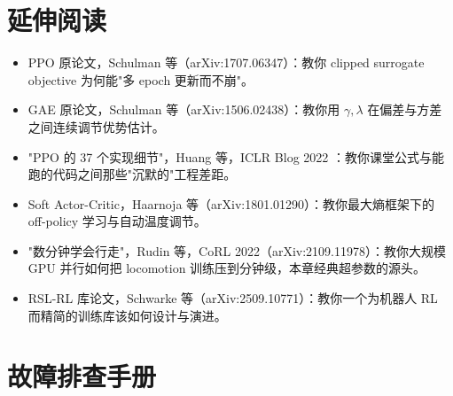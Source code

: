 \section*{延伸阅读}
\label{sec:rlmc-train-further}

\begin{itemize}
  \item PPO 原论文，Schulman 等（arXiv:1707.06347）\cite{schulman2017ppo}：教你 clipped surrogate objective 为何能"多 epoch 更新而不崩"。
  \item GAE 原论文，Schulman 等（arXiv:1506.02438）\cite{schulman2015gae}：教你用 $\gamma,\lambda$ 在偏差与方差之间连续调节优势估计。
  \item "PPO 的 37 个实现细节"，Huang 等，ICLR Blog 2022 \cite{huang2022ppo37}：教你课堂公式与能跑的代码之间那些"沉默的"工程差距。
  \item Soft Actor-Critic，Haarnoja 等（arXiv:1801.01290）\cite{haarnoja2018sac}：教你最大熵框架下的 off-policy 学习与自动温度调节。
  \item "数分钟学会行走"，Rudin 等，CoRL 2022（arXiv:2109.11978）\cite{rudin2022legged}：教你大规模 GPU 并行如何把 locomotion 训练压到分钟级，本章经典超参数的源头。
  \item RSL-RL 库论文，Schwarke 等（arXiv:2509.10771）\cite{schwarke2025rslrl}：教你一个为机器人 RL 而精简的训练库该如何设计与演进。
\end{itemize}

\section*{故障排查手册}
\label{sec:rlmc-train-troubleshoot}

